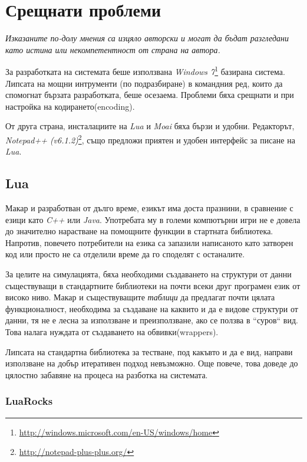 \section{Срещнати проблеми}

	\emph{Изказаните по-долу мнения са изцяло авторски и могат да бъдат разгледани като истина или некомпетентност от страна на автора.}
	
	За разработката на системата беше използвана \emph{Windows 7}\footnote{\url{http://windows.microsoft.com/en-US/windows/home}}
	базирана система. Липсата на мощни интрументи (по подразбиране) в командния ред, които да спомогнат бързата разработката,
	беше осезаема. Проблеми бяха срещнати и при настройка на кодирането(encoding).
	
	От друга страна, инсталациите на \emph{Lua} и \emph{Moai} бяха бързи и удобни. Редакторът, 
	\emph{Notepad++ (v6.1.2)}\footnote{\url{http://notepad-plus-plus.org/}}, 
	също предложи приятен и удобен интерфейс за писане на \emph{Lua}.

	\subsection{Lua}
		Макар и разработван от дълго време, езикът има доста празнини, в сравнение с езици като
		\emph{C++} или \emph{Java}. Употребата му в големи компютърни игри не е довела до
		значително нарастване на помощните функции в стартната библиотека. Напротив, повечето
		потребители на езика са запазили написаното като затворен код или просто не са отделили
		време да го споделят с останалите.
		
		За целите на симулацията, бяха необходими създаването на структури от данни съществуващи
		в стандартните библиотеки на почти всеки друг програмен език от високо ниво. Макар и
		съществуващите \emph{таблици} да предлагат почти цялата функционалност, необходима
		за създаване на каквито и да е видове структури от данни, тя не е лесна за използване
		и преизползване, ако се ползва в ``суров`` вид.	Това налага нуждата от създаването на
		обвивки(wrappers).
		
		Липсата на стандартна библиотека за тестване, под какъвто и да е вид, направи използване на
		добър итеративен подход невъзможно. Още повече, това доведе до цялостно забавяне на процеса
		на разботка на системата.
		
		\subsubsection{LuaRocks}
		
